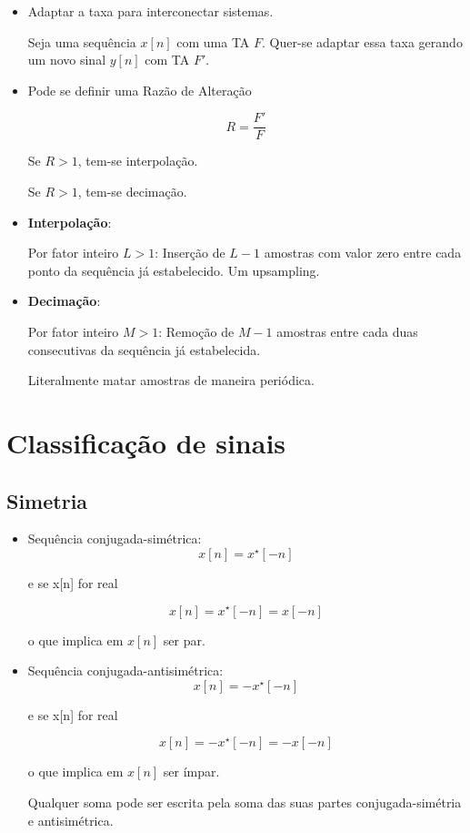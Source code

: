 \begin{itemize}
    \item Adaptar a taxa para interconectar sistemas.
    
    Seja uma sequência $x[n]$ com uma TA $F$. Quer-se adaptar essa taxa gerando um novo sinal $y[n]$ com TA $F'$.

    \item Pode se definir uma Razão de Alteração
    
    \[R = \frac{F'}{F}\]

    Se $R > 1$, tem-se interpolação.

    Se $R > 1$, tem-se decimação.

    \item \textbf{Interpolação}:
    
    Por fator inteiro $L > 1$: Inserção de $L - 1$ amostras com valor zero entre cada ponto da sequência já estabelecido. Um upsampling.

    \item \textbf{Decimação}:
    
    Por fator inteiro $M > 1$: Remoção de $M - 1$ amostras entre cada duas consecutivas da sequência já estabelecida.

    Literalmente matar amostras de maneira periódica.

\end{itemize}

\section{Classificação de sinais}
\subsection{Simetria}
\begin{itemize}
    \item Sequência conjugada-simétrica:
    \[ x[n] = x^{\star}[-n] \]

    e se x[n] for real

    \[ x[n] = x^{\star}[-n] = x[-n] \]

    o que implica em $x[n]$ ser par.

    \item Sequência conjugada-antisimétrica:
    \[ x[n] = -x^{\star}[-n] \]

    e se x[n] for real

    \[ x[n] = -x^{\star}[-n] = -x[-n] \]

    o que implica em $x[n]$ ser ímpar.

    Qualquer soma pode ser escrita pela soma das suas partes conjugada-simétria e antisimétrica.

\end{itemize}

